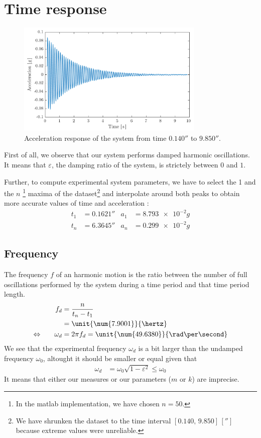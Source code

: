 \documentclass[a4paper, 12pt]{article}
\begin{document}
	\section{Time response}
	\begin{figure}[h]
		\centering
		\includegraphics[width=0.8\textwidth]{resources/pdf/time_response.pdf}
		\caption{Acceleration response of the system from time $\unit{\num{0.140}}{\second}$ to $\unit{\num{9.850}}{\second}$.}
	\end{figure}
	First of all, we observe that our system performs damped harmonic oscillations. It means that $\varepsilon$, the damping ratio of the system, is strictely between $0$ and $1$. \par
	Further, to compute experimental system parameters, we have to select the 1 and the $n$ \footnote{In the matlab implementation, we have chosen $n = \num{50}$.} maxima of the dataset\footnote{We have shrunken the dataset to the time interval $\left[\num{0.140}, \, \num{9.850}\right] \, \left[\second\right]$ because extreme values were unreliable.} and interpolate around both peaks to obtain more accurate values of time and acceleration :
	\begin{align*}
		t_1 & = \unit{\num{0.1621}}{\second} & a_1 & = \unit{\num{8.793e-2}}{g} \\
		t_n & = \unit{\num{6.3645}}{\second} & a_n & = \unit{\num{0.299e-2}}{g}
	\end{align*}
	\subsection{Frequency}
	The frequency $f$ of an harmonic motion is the ratio between the number of full oscillations performed by the system during a time period and that time period length.
	\begin{alignat*}{2}
		                      &  & f_d      & = \frac{n}{t_n - t_1}                               \\
		                      &  &          & = \unit{\num{7.9001}}{\hertz}                       \\
		\Leftrightarrow \quad &  & \omega_d & = 2 \pi f_d = \unit{\num{49.6380}}{\rad\per\second}
	\end{alignat*}
	We see that the experimental frequency $\omega_d$ is a bit larger than the undamped frequency $\omega_0$, altought it should be smaller or equal given that
	\begin{align*}
		\omega_d & = \omega_0 \sqrt{1 - \varepsilon^2} \leq \omega_0
	\end{align*}
	It means that either our measures or our parameters ($m$ or $k$) are imprecise.
\end{document}
